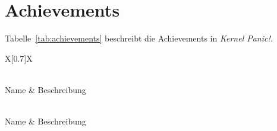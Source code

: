 \section{Achievements}

%

Tabelle~\ref{tab:achievements} beschreibt die Achievements in \emph{Kernel Panic!.}
\begingroup
  \small
  \tabulinesep=1.2mm
  \begin{longtabu}{X[0.7]X}
    \rowfont{\normalsize}
    \caption{Mögliche Achievements in \emph{Kernel Panic!}\label{tab:achievements}}\\
    \midrule[\heavyrulewidth]\rowfont{\itshape}
    Name & Beschreibung \\
    \midrule\endfirsthead

    \rowfont{\normalsize}
    \caption[]{Achievements (fortges.)}\\
    \midrule[\heavyrulewidth]\rowfont{\itshape}
    Name & Beschreibung \\
    \midrule\endhead

    \bottomrule
     \\
    \endfoot

    \endlastfoot


\end{longtabu}
